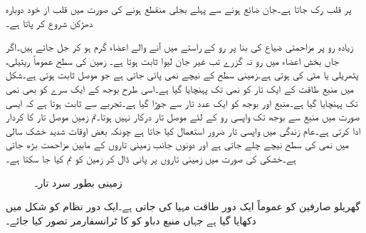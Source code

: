  پر قلب رک جاتا ہے۔جان ضائع ہونے سے پہلے بجلی منقطع ہونے کی صورت میں قلب از خود دوبارہ دھڑکن شروع کر پاتا ہے۔

زیادہ رو  پر مزاحمتی ضیاع کی بنا پر رو کے راستے میں آنے والے اعضاء گرم ہو کر جل جاتے ہیں۔اگر جاں بخش اعضاء میں رو نہ گزرے تب غیر جان لیوا ثابت ہوتا ہے۔  
زمین کی سطح عموماً ریتیلی، پٹھریلی یا مٹی کی ہوتی ہے۔زمینی سطح کے نیچے نمی پائی جاتی ہے جو موصل ثابت ہوتی ہے۔شکل  میں منبع طاقت کے ایک تار کو نمی تک پہنچایا گیا ہے۔اسی طرح بوجھ کے ایک سرے کو بھی نمی تک پہنچایا گیا ہے۔منبع اور بوجھ کو ایک عدد تار سے جوڑا گیا ہے۔تجربے سے ثابت ہوتا ہے کہ ایسی صورت میں منبع سے بوجھ تک واپسی رو کے لئے موصل تار درکار نہیں ہوتا۔نم زمین موصل تار کا کردار ادا کرتی ہے۔عام زندگی میں واپسی تار ضرور استعمال کیا جاتا ہے چونکہ بعض اوقات شدید خشک سالی میں نمی کی سطح نیچے چلے جاتی ہے اور دونوں جانب زمینی تاروں کے مابین مزاحمت بڑھ جاتی ہے۔خشکی کی صورت میں زمینی تاروں پر پانی ڈال کر زمین کو نم کیا جا سکتا ہے۔
\begin{figure}
\centering
{}
\caption{زمینی بطور سرد تار۔}
\label{شکل_طاقت_زمین_سرد_تار}
\end{figure}
 
گھریلو صارفین کو عموماً ایک دور طاقت مہیا کی جاتی ہے۔ایک دور نظام کو شکل  میں دکھایا گیا ہے جہاں منبع دباو کو  کا ٹرانسفارمر تصور کیا جائے۔

